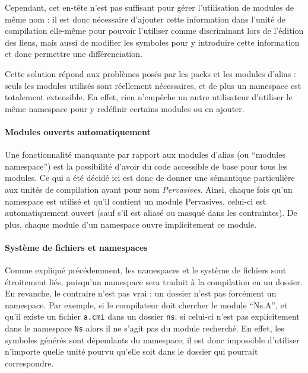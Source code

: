 \documentclass[11pt,a4paper]{report}
\begin{document}
Cependant, cet en-tête n'est pas suffisant pour gérer l'utilisation de modules de
même nom : il est donc nécessaire d'ajouter cette information dans l'unité de
compilation elle-même pour pouvoir l'utiliser comme discriminant lors de
l'édition des liens, mais aussi de modifier les symboles pour y introduire cette
information et donc permettre une différenciation.

Cette solution répond aux problèmes posés par les packs et les modules d'alias :
seuls les modules utilisés sont réellement nécessaires, et de plus un namespace
est totalement extensible. En effet, rien n'empêche un autre utilisateur
d'utiliser le même namespace pour y redéfinir certains modules ou en ajouter.

\paragraph{Modules ouverts automatiquement}

Une fonctionnalité manquante par rapport aux modules d'alias (ou ``modules
namespace'') est la possibilité d'avoir du code accessible de base pour tous les
modules. Ce qui a été décidé ici est donc de donner une sémantique particulière
aux unités de compilation ayant pour nom \emph{Pervasives}. Ainsi, chaque fois
qu'un namespace est utilisé et qu'il contient un module Pervasives, celui-ci est
automatiquement ouvert (sauf s'il est aliasé ou masqué dans les contraintes). De
plus, chaque module d'un namespace ouvre implicitement ce module.

\paragraph{Système de fichiers et namespaces}

Comme expliqué précédemment, les namespaces et le système de fichiers sont
étroitement liés, puisqu'un namespace sera traduit à la compilation en un
dossier. En revanche, le contraire n'est pas vrai : un dossier n'est pas
forcément un namespace. Par exemple, si le compilateur doit chercher le module
``Ns.A'', et qu'il existe un fichier \texttt{a.cmi} dans un dossier \texttt{ns},
si celui-ci n'est pas explicitement dans le namespace \texttt{Ns} alors il ne
s'agit pas du module recherché. En effet, les symboles générés sont dépendants
du namespace, il est donc impossible d'utiliser n'importe quelle unité pourvu
qu'elle soit dans le dossier qui pourrait correspondre. 

\end{document}
